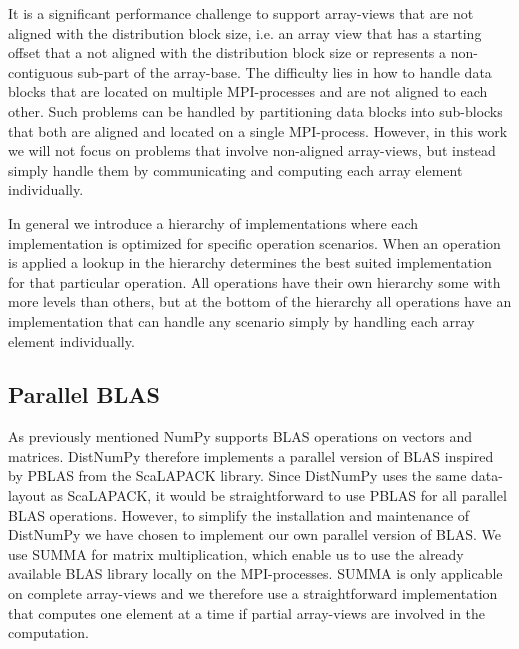 \documentclass{sigplanconf}
\begin{document}

It is a significant performance challenge to support array-views that are not aligned with the distribution block size, i.e. an array view that has a starting offset that a not aligned with the distribution block size or represents a non-contiguous sub-part of the array-base. The difficulty lies in how to handle data blocks that are located on multiple MPI-processes and are not aligned to each other. Such problems can be handled by partitioning data blocks into sub-blocks that both are aligned and located on a single MPI-process. However, in this work we will not focus on problems that involve non-aligned array-views, but instead simply handle them by communicating and computing each array element individually.

In general we introduce a hierarchy of implementations where each implementation is optimized for specific operation scenarios. When an operation is applied a lookup in the hierarchy determines the best suited implementation for that particular operation. All operations have their own hierarchy some with more levels than others, but at the bottom of the hierarchy all operations have an implementation that can handle any scenario simply by handling each array element individually.



\subsection{Parallel BLAS}
As previously mentioned NumPy supports BLAS operations on vectors and matrices. DistNumPy therefore implements a parallel version of BLAS inspired by PBLAS from the ScaLAPACK library. Since DistNumPy uses the same data-layout as ScaLAPACK, it would be straightforward to use PBLAS for all parallel BLAS operations. However, to simplify the installation and maintenance of DistNumPy we have chosen to implement our own parallel version of BLAS. We use SUMMA\cite{SUMMA_GeijnW97} for matrix multiplication, which enable us to use the already available BLAS library locally on the MPI-processes. SUMMA is only applicable on complete array-views and we therefore use a straightforward implementation that computes one element at a time if partial array-views are involved in the computation. 
\end{document}
